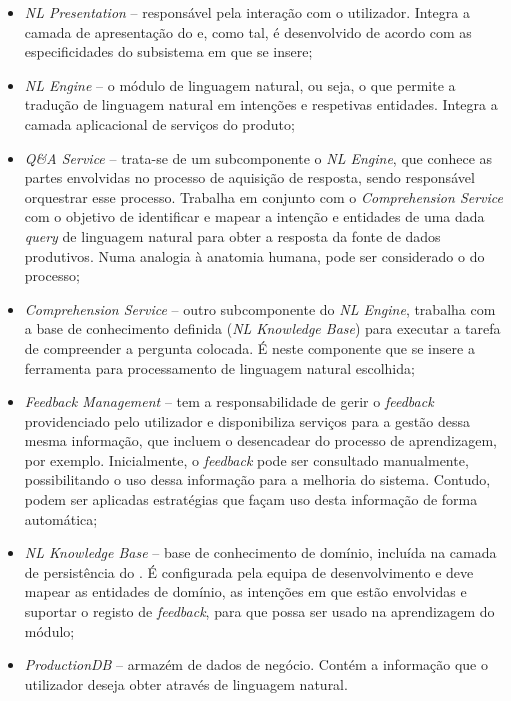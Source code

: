 %
\begin{itemize}
    \item 
    {
        \textit{NL Presentation} -- responsável pela interação com o utilizador. Integra a camada de apresentação do {\productname} e, como tal, é desenvolvido de acordo com as especificidades do subsistema em que se insere;
    }
    \item 
    {
        \textit{NL Engine} -- o módulo de linguagem natural, ou seja, o  que permite a tradução de linguagem natural em intenções e respetivas entidades. Integra a camada aplicacional de serviços do produto;
    }
    \item 
    {
        \textit{Q\&A Service} -- trata-se de um subcomponente o \textit{NL Engine}, que conhece as partes envolvidas no processo de aquisição de resposta, sendo responsável orquestrar esse processo. Trabalha em conjunto com o \textit{Comprehension Service} com o objetivo de identificar e mapear a intenção e entidades de uma dada \textit{query} de linguagem natural para obter a resposta da fonte de dados produtivos. Numa analogia à anatomia humana, pode ser considerado o  do processo;
    }
    \item 
    {
        \textit{Comprehension Service} -- outro subcomponente do \textit{NL Engine}, trabalha com a base de conhecimento definida (\textit{NL Knowledge Base}) para executar a tarefa de compreender a pergunta colocada. É neste componente que se insere a ferramenta para processamento de linguagem natural escolhida;
    }
    \item 
    {
        \textit{Feedback Management} -- tem a responsabilidade de gerir o \textit{feedback} providenciado pelo utilizador e disponibiliza serviços para a gestão dessa mesma informação, que incluem o desencadear do processo de aprendizagem, por exemplo. Inicialmente, o \textit{feedback} pode ser consultado manualmente, possibilitando o uso dessa informação para a melhoria do sistema. Contudo, podem ser aplicadas estratégias que façam uso desta informação de forma automática;
    }
    \item 
    {
        \textit{NL Knowledge Base} -- base de conhecimento de domínio, incluída na camada de persistência do {\productname}. É configurada pela equipa de desenvolvimento e deve mapear as entidades de domínio, as intenções em que estão envolvidas e suportar o registo de \textit{feedback}, para que possa ser usado na aprendizagem do módulo;
    }
    \item 
    {
        \textit{ProductionDB} -- armazém de dados de negócio. Contém a informação que o utilizador deseja obter através de linguagem natural.
    }
\end{itemize}

